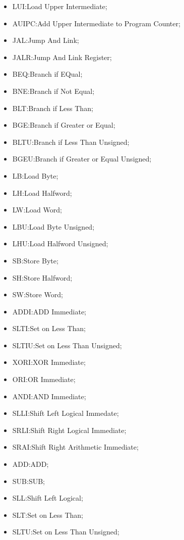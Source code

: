 \begin{itemize}[leftmargin=20mm]
    \item {LUI:\@ Load Upper Intermediate;}
    \item {AUIPC:\@ Add Upper Intermediate to Program Counter;}
    \item {JAL:\@ Jump And Link;}
    \item {JALR:\@ Jump And Link Register;}
    \item {BEQ:\@ Branch if EQual;}
    \item {BNE:\@ Branch if Not Equal;}
    \item {BLT:\@ Branch if Less Than;}
    \item {BGE:\@ Branch if Greater or Equal;}
    \item {BLTU:\@ Branch if Less Than Unsigned;}
    \item {BGEU:\@ Branch if Greater or Equal Unsigned;}
    \item {LB:\@ Load Byte;}
    \item {LH:\@ Load Halfword;}
    \item {LW:\@ Load Word;}
    \item {LBU:\@ Load Byte Unsigned;}
    \item {LHU:\@ Load Halfword Unsigned;}
    \item {SB:\@ Store Byte;}
    \item {SH:\@ Store Halfword;}
    \item {SW:\@ Store Word;}
    \item {ADDI:\@ ADD Immediate;}
    \item {SLTI:\@ Set on Less Than;}
    \item {SLTIU:\@ Set on Less Than Unsigned;}
    \item {XORI:\@ XOR Immediate;}
    \item {ORI:\@ OR Immediate;}
    \item {ANDI:\@ AND Immediate;}
    \item {SLLI:\@ Shift Left Logical Immedate;}
    \item {SRLI:\@ Shift Right Logical Immediate;}
    \item {SRAI:\@ Shift Right Arithmetic Immediate;}
    \item {ADD:\@ ADD;}
    \item {SUB:\@ SUB;}
    \item {SLL:\@ Shift Left Logical;}
    \item {SLT:\@ Set on Less Than;}
    \item {SLTU:\@ Set on Less Than Unsigned;}

\end{itemize}

